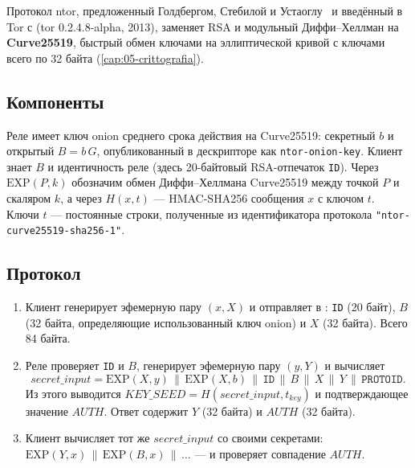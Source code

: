 Протокол ntor, предложенный Голдбергом, Стебилой и Устаоглу~\cite{goldberg2013ntor} и введённый в Tor с  (tor 0.2.4.8-alpha, 2013), заменяет RSA и модульный Диффи--Хеллман на \textbf{Curve25519}, быстрый обмен ключами на эллиптической кривой с ключами всего по 32 байта (\cref{cap:05-crittografia}).

\subsection{Компоненты}

Реле имеет ключ onion среднего срока действия на Curve25519: секретный $b$ и открытый $B = b\,G$, опубликованный в дескрипторе как \texttt{ntor-onion-key}. Клиент знает $B$ и идентичность реле (здесь 20-байтовый RSA-отпечаток \texttt{ID}). Через $\mathrm{EXP}(P, k)$ обозначим обмен Диффи--Хеллмана Curve25519 между точкой $P$ и скаляром $k$, а через $H(x, t)$ --- HMAC-SHA256 сообщения $x$ с ключом $t$. Ключи $t$ --- постоянные строки, полученные из идентификатора протокола \texttt{"ntor-curve25519-sha256-1"}.

\subsection{Протокол}

\begin{enumerate}
  \item Клиент генерирует эфемерную пару $(x, X)$ и отправляет в : \texttt{ID} (20 байт), $B$ (32 байта, определяющие использованный ключ onion) и $X$ (32 байта). Всего 84 байта.
  \item Реле проверяет \texttt{ID} и $B$, генерирует эфемерную пару $(y, Y)$ и вычисляет
  \[ \mathit{secret\_input} = \mathrm{EXP}(X, y) \,\|\, \mathrm{EXP}(X, b) \,\|\, \texttt{ID} \,\|\, B \,\|\, X \,\|\, Y \,\|\, \texttt{PROTOID}. \]
  Из этого выводится $\mathit{KEY\_SEED} = H(\mathit{secret\_input}, t_{\mathit{key}})$ и подтверждающее значение $\mathit{AUTH}$. Ответ содержит $Y$ (32 байта) и $\mathit{AUTH}$ (32 байта).
  \item Клиент вычисляет тот же $\mathit{secret\_input}$ со своими секретами: $\mathrm{EXP}(Y, x) \,\|\,\allowbreak \mathrm{EXP}(B, x) \,\|\, \ldots$ --- и проверяет совпадение $\mathit{AUTH}$.
\end{enumerate}


